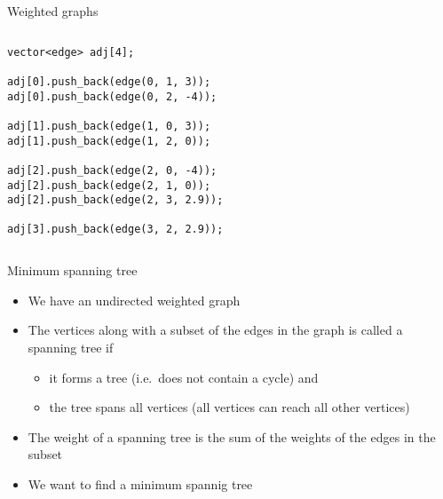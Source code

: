 \documentclass[10pt]{beamer}
\newcommand{\bi}{\begin{itemize}}
\newcommand{\ei}{\end{itemize}}
\begin{document}
\begin{frame}[fragile]{Weighted graphs}
    \begin{columns}[T]
        \begin{column}{.4\textwidth}
            \begin{verbatim}
vector<edge> adj[4];

adj[0].push_back(edge(0, 1, 3));
adj[0].push_back(edge(0, 2, -4));

adj[1].push_back(edge(1, 0, 3));
adj[1].push_back(edge(1, 2, 0));

adj[2].push_back(edge(2, 0, -4));
adj[2].push_back(edge(2, 1, 0));
adj[2].push_back(edge(2, 3, 2.9));

adj[3].push_back(edge(3, 2, 2.9));

            \end{verbatim}
        \end{column}%
        \hfill%
        \begin{column}{.6\textwidth}
            \begin{figure}
            \end{figure}
        \end{column}%
    \end{columns}
\end{frame}

\begin{frame}{Minimum spanning tree}
    \bi
        \item We have an undirected weighted graph
        \item The vertices along with a subset of the edges in the graph is called a spanning tree if
            \bi
                \item it forms a tree (i.e.\ does not contain a cycle) and
                \item the tree spans all vertices (all vertices can reach all other vertices)
            \ei
        \vspace{10pt}
        \item The weight of a spanning tree is the sum of the weights of the edges in the subset
        \vspace{10pt}
        \item We want to find a minimum spannig tree
    \ei
\end{frame}
\end{document}
